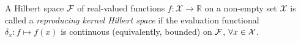 \begin{definition}\label{def:rkhs}
	A Hilbert space ${\mathcal F}$ of real-valued functions $f:\mathcal X \rightarrow \mathbb R$ on a non-empty set $\mathcal X$ is called a \emph{reproducing kernel Hilbert space} if the evaluation functional $\delta_x: f \mapsto f(x)$ is continuous (equivalently, bounded) on ${\mathcal F}$, $\forall x \in {\mathcal X}$. 
\end{definition}

%
%


